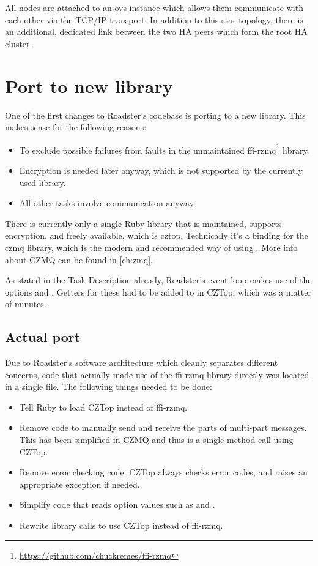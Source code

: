 All nodes are attached to an \gls{ovs} instance which allows them communicate with each
other via the TCP/IP transport. In addition to this star topology, there is an
additional, dedicated link between the two HA peers which form the root HA
cluster.


\section{Port to new \zmq library}\label{sec:approach:port}
One of the first changes to Roadster's codebase is porting to a new \zmq
library. This makes sense for the following reasons:

\begin{itemize}
\item To exclude possible failures from faults in the unmaintained ffi-rzmq\footnote{\url{https://github.com/chuckremes/ffi-rzmq}} library.
\item Encryption is needed later anyway, which is not supported by the currently used library.
\item All other tasks involve \zmq communication anyway.
\end{itemize}

There is currently only a single Ruby library that is maintained, supports
encryption, and freely available, which is \gls{cztop}. Technically it's a
binding for the \gls{czmq} library, which is the modern and recommended way of
using \zmq. More info about CZMQ can be found in \autoref{ch:zmq}.

As stated in the Task Description already, Roadster's event loop makes use of
the \zmq options  and . Getters for these had to be
added to in CZTop, which was a matter of minutes.

\subsection{Actual port}
Due to Roadster's software architecture which cleanly separates different concerns, code that actually made use
of the ffi-rzmq library directly was located in a single file. The following
things needed to be done:

\begin{itemize}
\item Tell Ruby to load CZTop instead of ffi-rzmq.
\item Remove code to manually send and receive the parts of multi-part messages. This has been simplified
in CZMQ and thus is a single method call using CZTop.
\item Remove error checking code. CZTop always checks error codes, and raises
an appropriate exception if needed.
\item Simplify code that reads option values such as  and .
\item Rewrite library calls to use CZTop instead of ffi-rzmq.
\end{itemize}

